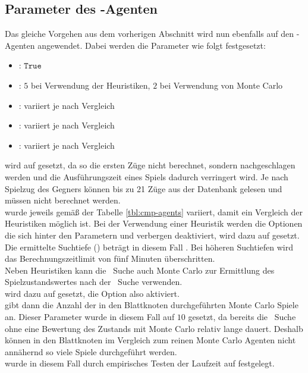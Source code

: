 \subsection{Parameter des \mxZitat{\abp}-Agenten}
\label{eval:agents:params:subsec-ab}
Das gleiche Vorgehen aus dem vorherigen Abschnitt wird nun ebenfalls auf den \mxZitat{\abp}-Agenten angewendet.
Dabei werden die Parameter wie folgt festgesetzt:
\begin{itemize}
\item {}: $\mathtt{True}$
\item {}: $5$ bei Verwendung der Heuristiken, $2$ bei Verwendung von Monte Carlo
\item {}: variiert je nach Vergleich
\item {}: variiert je nach Vergleich
\item {}: variiert je nach Vergleich
\end{itemize}
 wird auf  gesetzt, da so die ersten Züge nicht berechnet, sondern nachgeschlagen werden und die Ausführungszeit eines Spiels dadurch verringert wird. Je nach Spielzug des Gegners können bis zu 21 Züge aus der Datenbank  gelesen und müssen nicht berechnet werden.
\\ wurde jeweils gemäß der Tabelle \ref{tbl:cmp-agents} variiert, damit ein Vergleich der Heuristiken möglich ist. Bei der Verwendung einer Heuristik werden die Optionen die sich hinter den Parametern  und  verbergen deaktiviert,  wird dazu auf  gesetzt. 
Die ermittelte Suchtiefe () beträgt in diesem Fall . Bei höheren Suchtiefen wird das Berechnungszeitlimit von fünf Minuten überschritten.
\vspace{0.5cm}
\\Neben Heuristiken kann die \abab\ Suche auch Monte Carlo zur Ermittlung des Spielzustandswertes nach der \abab\ Suche verwenden.
\\ wird dazu auf  gesetzt, die Option also aktiviert. \\ gibt dann die Anzahl der in den Blattknoten durchgeführten Monte Carlo Spiele an. Dieser Parameter wurde in diesem Fall auf $10$ gesetzt, da bereits die \abab\ Suche ohne eine Bewertung des Zustands mit Monte Carlo relativ lange dauert. Deshalb können in den Blattknoten im Vergleich zum reinen Monte Carlo Agenten nicht annähernd so viele Spiele durchgeführt werden.
\\ wurde in diesem Fall durch empirisches Testen der Laufzeit auf  festgelegt. 


